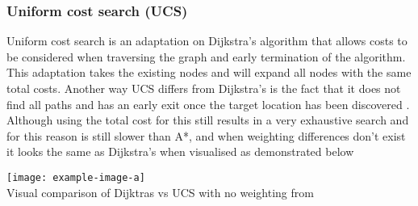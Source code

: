 \subsubsection{Uniform cost search (UCS)}
Uniform cost search is an adaptation on Dijkstra’s algorithm that allows costs to be considered when traversing the graph and early termination of the algorithm. This adaptation takes the existing nodes and will expand all nodes with the same total costs. Another way UCS differs from Dijkstra’s is the fact that it does not find all paths and has an early exit once the target location has been discovered \citetemp.  Although using the total cost for this still results in a very exhaustive search and for this reason is still slower than A*, and when weighting differences don’t exist it looks the same as Dijkstra’s when visualised as demonstrated below
\begin{center}
\texttt{[image: example-image-a]}\\
Visual comparison of Dijktras vs UCS with no weighting from \citetemp
\end{center}

